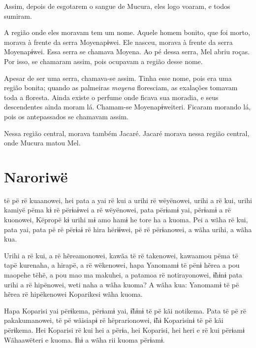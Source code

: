
Assim, depois de esgotarem o sangue de Mucura, eles logo voaram, e todos
sumiram. 


A região onde eles moravam tem um nome. Aquele homem bonito, que foi
morto, morava à frente da serra Moyenapɨwei. Ele nasceu, morava à frente
da serra Moyenapɨwei.  Essa serra se chamava Moyena.
Ao pé dessa serra, Mel abriu roças. Por isso, se chamaram assim, pois
ocupavam a região desse nome. 

\enlargethispage{1\baselineskip}
Apesar de ser uma serra, chamava-se assim. Tinha esse nome, pois era uma
região bonita; quando as palmeiras \textit{moyena} floresciam, as exalações
tomavam toda a floresta. Ainda existe o perfume onde ficava sua moradia,
e seus descendentes ainda moram lá. Chamam-se Moyenapɨweiteri. Ficaram
morando lá, pois os antepassados se chamavam assim. 

Nessa região central, morava também Jacaré. Jacaré morava nessa região
central, onde Mucura matou Mel.

\chapter{Naroriwë}

 të pë rë kuaanowei, hei pata a yai rë kui a urihi rë wëyënowei,
urihi a rë kui, urihi kamiyë pëma kɨ rë përɨaɨwei a rë wëyënowei, pata
përɨamɨ yai, përɨamɨ a rë kuonowei, Këpropë kɨ urihi mɨ amo hamɨ he tore
ha a kuoma. Pei a wãha rë kui, pata yai, pata pë rë përɨaɨ rë hira
hërɨɨwei, pë rë përɨanowei, a wãha urihi, a wãha kua.

Urihi a rë kui, a rë hẽreamonowei, kawãa të rë takenowei, kawaamou pëma
të tapë kurenaha, a hirapë, a rë wëkenowei, hapa Yanomamɨ të pënɨ hẽrea
a pou maopehe tëhë, a pou mao ma makuhei, a patamoa rë notirayonowei,
ɨ̃hɨnɨ pata urihi a rë hipënowei, weti naha a wãha kuoma? A wãha kua:
Yanomamɨ të pë hẽrea rë hipëkenowei Koparikesi wãha kuoma. 

Hapa Koparisi yai përɨkema, përɨamɨ yai, ɨ̃hɨnɨ të pë kãi notikema. Pata
të pë rë pakakumanowei, të pë wãisiapɨ rë hëprarionowei, ɨ̃hɨ Koparisinɨ
të pë kãi përɨkema. Hei Koparisi rë kui hei a përɨa, hei Koparisi, hei
heri e rë kui përɨamɨ Wãhaawëteri e kuoma. Ɨhɨ a wãha rii kuoma
përɨamɨ. 

